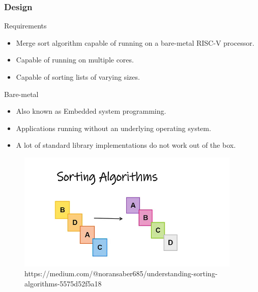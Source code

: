 \begin{frame}[hoved]
	\frametitle{Design}
	\begin{minipage}[t]{0.45\textwidth}
		{\large Requirements}
		\begin{itemize}
			\item Merge sort algorithm capable of running on a bare-metal RISC-V
			      processor.
			\item Capable of running on multiple cores.
			\item Capable of sorting lists of varying sizes.
		\end{itemize}
		{\large Bare-metal}
		\begin{itemize}
			\item Also known as Embedded system programming.
			\item Applications running without an underlying operating system.
			\item A lot of standard library implementations do not work out of the
			      box.
		\end{itemize}
	\end{minipage}
	\hfill
	\begin{minipage}[t]{0.45\textwidth}
		\begin{figure}
			\begin{center}
				\includegraphics[width=0.95\textwidth]{figures/sorting.png}
			\end{center}
			\caption{\tiny https://medium.com/@noransaber685/understanding-sorting-algorithms-5575d52f5a18}\label{fig:}
		\end{figure}
	\end{minipage}
\end{frame}


